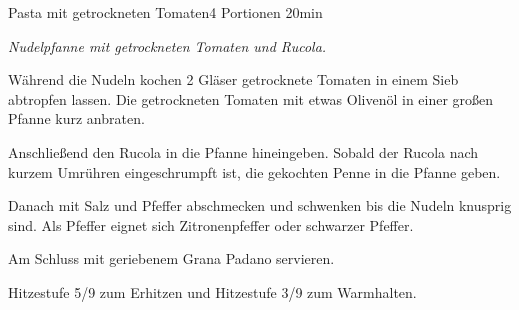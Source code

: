 \documentclass[../recipe-collections/cooking.tex]{subfiles}
\begin{document}
\begin{recipe}{Pasta mit getrockneten Tomaten}{4 Portionen }{20min }

  \freeform{}\textit{Nudelpfanne mit getrockneten Tomaten und Rucola.}


  Während die Nudeln kochen 2 Gläser getrocknete Tomaten in einem Sieb abtropfen lassen.
  Die getrockneten Tomaten mit etwas Olivenöl in einer großen Pfanne kurz anbraten.


  Anschließend den Rucola in die Pfanne hineingeben.
  Sobald der Rucola nach kurzem Umrühren eingeschrumpft ist, die gekochten Penne in die Pfanne geben.


  Danach mit Salz und Pfeffer abschmecken und schwenken bis die Nudeln knusprig sind.
  Als Pfeffer eignet sich Zitronenpfeffer oder schwarzer Pfeffer.


  Am Schluss mit geriebenem Grana Padano servieren.

  \freeform{}\hrulefill{}

  \freeform{}
  Hitzestufe 5/9 zum Erhitzen und Hitzestufe 3/9 zum Warmhalten.

\end{recipe}
\end{document}
